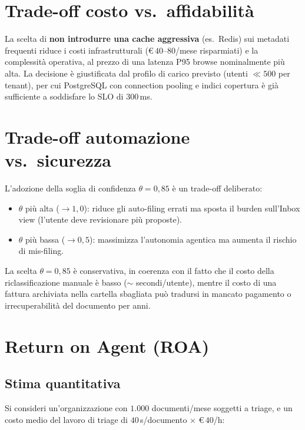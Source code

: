 \section{Trade-off costo vs.\ affidabilit\`a}
\label{sec:tradeoff_cost}

La scelta di \textbf{non introdurre una cache aggressiva} (es.\ Redis) sui metadati
frequenti riduce i costi infrastrutturali (\euro$\,40$--$80$/mese risparmiati) e la
complessit\`a operativa, al prezzo di una latenza P95 browse nominalmente pi\`u alta.
La decisione \`e giustificata dal profilo di carico previsto (utenti $\ll 500$ per tenant),
per cui PostgreSQL con connection pooling e indici copertura \`e gi\`a sufficiente
a soddisfare lo SLO di 300\,ms.

\section{Trade-off automazione vs.\ sicurezza}
\label{sec:tradeoff_safety}

L'adozione della soglia di confidenza $\theta = 0{,}85$ \`e un trade-off deliberato:

\begin{itemize}[leftmargin=*]
    \item $\theta$ pi\`u alta ($\rightarrow 1{,}0$): riduce gli auto-filing errati ma
          sposta il burden sull'Inbox view (l'utente deve revisionare pi\`u proposte).
    \item $\theta$ pi\`u bassa ($\rightarrow 0{,}5$): massimizza l'autonomia agentica
          ma aumenta il rischio di mis-filing.
\end{itemize}

La scelta $\theta = 0{,}85$ \`e conservativa, in coerenza con il fatto che il costo
della riclassificazione manuale \`e basso ($\sim$ secondi/utente), mentre il costo
di una fattura archiviata nella cartella sbagliata pu\`o tradursi in mancato pagamento
o irrecuperabilit\`a del documento per anni.

\section{Return on Agent (ROA)}
\label{sec:roa}

\subsection{Stima quantitativa}

Si consideri un'organizzazione con $1.000$ documenti/mese soggetti a triage, e un costo
medio del lavoro di triage di $40$\,s/documento $\times$ \euro$\,40$/h:

